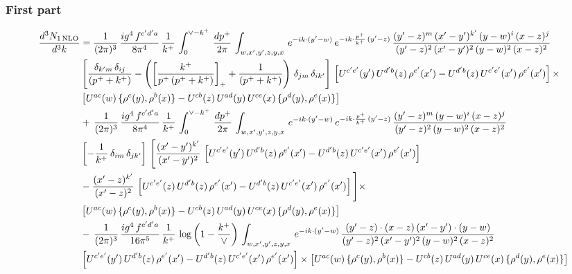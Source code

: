 \documentclass[9pt]{article}
\numberwithin{equation}{section}
\begin{document}
\subsubsection{First part}
\begin{align}
     \frac{d^{3}N_{1\,\rm NLO}}{d^{3}k} & =  \frac{1}{(2\pi)^{3}}\, \frac{ig^{4}\,f^{c'd'a}}{8\pi^{4}}\, \frac{1}{k^{+}}\,\int_{0}^{\vee-k^{+}}\,  \frac{dp^{+}}{2\pi}\, \int_{w,x',y',z,y,x}\, e^{-ik\cdot (y'-w)}\, e^{-ik\cdot \frac{p^{+}}{k^{+}}\,(y'-z)}\,\frac{(y'-z)^{m}\,(x'-y')^{k'}\,(y-w)^{i}\,(x-z)^{j}}{(y'-z)^{2}\,(x'-y')^{2}\,(y-w)^{2}\,(x-z)^{2}}\notag \\ & \left[\frac{\delta_{k'm}\,\delta_{ij}}{(p^{+}+k^{+})}-\left(\left[\frac{k^{+}}{p^{+}\,(p^{+}+k^{+})}\right]_{+}+\frac{1}{(p^{+}+k^{+})}\right)\,\delta_{jm}\,\delta_{ik'}\right]\, \left[U^{c'e'}(y')\,U^{d'b}(z)\,\rho^{e'}(x')-U^{d'b}(z)\,U^{c'e'}(x')\,\rho^{e'}(x')\right]\times\notag \\ &  \left[U^{ac}(w)\, \{\rho^{c}(y),\rho^{b}(x)\}-U^{cb}(z)\,U^{ad}(y)\,U^{ce}(x)\,\{\rho^{d}(y),\rho^{e}(x)\}\right] \notag \\
&  +\,\frac{1}{(2\pi)^{3}}\, \frac{ig^{4}\,f^{c'd'a}}{8\pi^{4}}\, \frac{1}{k^{+}}\,\int_{0}^{\vee-k^{+}}\,  \frac{dp^{+}}{2\pi}\, \int_{w,x',y',z,y,x}\, e^{-ik\cdot (y'-w)}\, e^{-ik\cdot \frac{p^{+}}{k^{+}}\,(y'-z)}\,\frac{(y'-z)^{m}\,(y-w)^{i}\,(x-z)^{j}}{(y'-z)^{2}\,(y-w)^{2}\,(x-z)^{2}}\notag \\ &   \left[-\frac{1}{k^{+}}\, \delta_{im}\, \delta_{jk'}\right]\, \Bigg[\frac{(x'-y')^{k'}}{(x'-y')^{2}}\,\left[U^{c'e'}(y')\,U^{d'b}(z)\,\rho^{e'}(x')-U^{d'b}(z)\,U^{c'e'}(x')\,\rho^{e'}(x')\right]\notag \\ & -\frac{(x'-z)^{k'}}{(x'-z)^{2}}\,\left[U^{c'e'}(z)\,U^{d'b}(z)\,\rho^{e'}(x')-U^{d'b}(z)\,U^{c'e'}(x')\,\rho^{e'}(x')\right]\Bigg]\times\notag \\ &   \left[U^{ac}(w)\, \{\rho^{c}(y),\rho^{b}(x)\}-U^{cb}(z)\,U^{ad}(y)\,U^{ce}(x)\,\{\rho^{d}(y),\rho^{e}(x)\}\right] \notag \\
& -\,\frac{1}{(2\pi)^{3}}\, \frac{ig^{4}\,f^{c'd'a}}{16\pi^{5}}\, \frac{1}{k^{+}}\,\log{\left(1-\frac{k^{+}}{\vee}\right)}\, \int_{w,x',y',z,y,x}\, e^{-ik\cdot (y'-w)}\,\frac{(y'-z)\cdot (x-z)\,(x'-y')\cdot (y-w)}{(y'-z)^{2}\,(x'-y')^{2}\,(y-w)^{2}\,(x-z)^{2}}\notag \\ &  \left[U^{c'e'}(y')\,U^{d'b}(z)\,\rho^{e'}(x')-U^{d'b}(z)\,U^{c'e'}(x')\,\rho^{e'}(x')\right]\times  \left[U^{ac}(w)\, \{\rho^{c}(y),\rho^{b}(x)\}-U^{cb}(z)\,U^{ad}(y)\,U^{ce}(x)\,\{\rho^{d}(y),\rho^{e}(x)\}\right]
\end{align}
\end{document}
